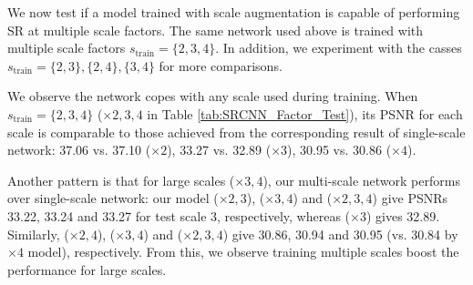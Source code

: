 \documentclass[10pt,twocolumn,letterpaper]{article}
\begin{document}
We now test if a model trained with scale augmentation is capable of performing SR at multiple scale factors. The same network used above is trained with multiple scale factors $s_{\text{train}} = \{2,3,4\}$. In addition, we experiment with the casses $s_{\text{train}} = \{2,3\}, \{2,4\}, \{3,4\}$ for more comparisons. 

We observe the network copes with any scale used during training. When $s_{\text{train}} = \{2,3,4\}$ ($\times 2, 3, 4$ in Table \ref{tab:SRCNN_Factor_Test}), its PSNR for each scale is comparable to those achieved from the corresponding result of single-scale network: 37.06 vs. 37.10 ($\times 2$), 33.27 vs. 32.89 ($\times 3$), 30.95 vs. 30.86 ($\times 4$).

Another pattern is that for large scales ($\times 3,4$), our multi-scale network performs over single-scale network: our model ($\times 2,3$), ($\times 3,4$) and ($\times 2, 3,4$) give PSNRs 33.22, 33.24 and 33.27 for test scale 3, respectively, whereas ($\times 3$) gives 32.89. Similarly, ($\times 2,4$), ($\times 3,4$) and ($\times 2, 3,4$) give 30.86, 30.94 and 30.95 (vs. 30.84 by $\times 4$ model),  respectively. From this, we observe training multiple scales boost the performance for large scales.
\end{document}
